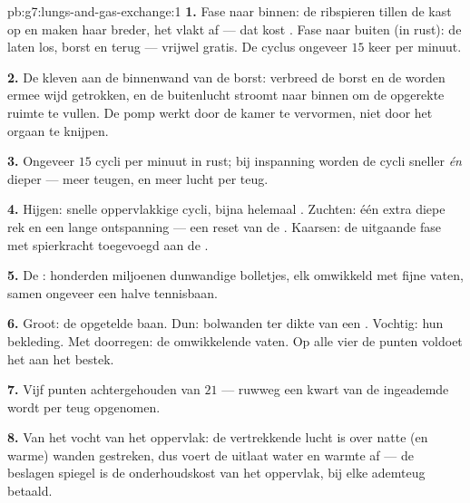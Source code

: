 \begin{solution}{pb:g7:lungs-and-gas-exchange:1}
\textbf{1.} Fase naar binnen: de ribspieren tillen de kast op en maken
haar breder, het  vlakt af --- dat kost . Fase naar
buiten (in rust): de  laten los, borst en   terug ---
vrijwel gratis. De cyclus ongeveer $15$ keer per minuut.

\textbf{2.} De  kleven aan de binnenwand van de borst: verbreed de
borst en de  worden ermee wijd getrokken, en de buitenlucht stroomt
naar binnen om de opgerekte ruimte te vullen. De pomp werkt door de kamer
te vervormen, niet door het orgaan te knijpen.

\textbf{3.} Ongeveer $15$ cycli per minuut in rust; bij inspanning worden
de cycli sneller \emph{én} dieper --- meer teugen, en meer lucht per teug.

\textbf{4.} Hijgen: snelle oppervlakkige cycli, bijna helemaal .
Zuchten: één extra diepe rek en een lange ontspanning --- een reset van de
. Kaarsen: de uitgaande fase met spierkracht toegevoegd aan de .

\textbf{5.} De : honderden miljoenen dunwandige bolletjes,
elk omwikkeld met fijne vaten, samen ongeveer een halve tennisbaan.

\textbf{6.} Groot: de opgetelde baan. Dun: bolwanden ter dikte van een
. Vochtig: hun bekleding. Met  doorregen: de omwikkelende vaten.
Op alle vier de punten voldoet het aan het bestek.

\textbf{7.} Vijf punten achtergehouden van $21$ --- ruwweg een kwart van
de ingeademde  wordt per teug opgenomen.

\textbf{8.} Van het vocht van het oppervlak: de vertrekkende lucht is over
natte (en warme) wanden gestreken, dus voert de uitlaat water en warmte
af --- de beslagen spiegel is de onderhoudskost van het oppervlak, bij
elke ademteug betaald.


\end{solution}
